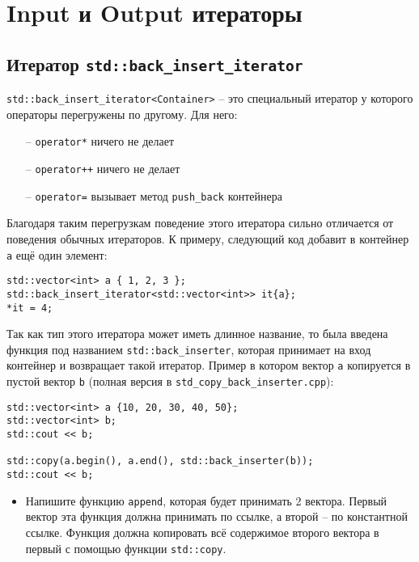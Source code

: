 \documentclass{article}
\begin{document}
\newpage

\section*{Input и Output итераторы}
\subsection*{Итератор \texttt{std::back\_insert\_iterator}}
\texttt{std::back\_insert\_iterator<Container>} -- это специальный итератор у которого операторы перегружены по другому. Для него:
\begin{itemize}
\item[--] \texttt{operator*} ничего не делает
\item[--] \texttt{operator++} ничего не делает
\item[--] \texttt{operator=} вызывает метод \texttt{push\_back} контейнера
\end{itemize}

Благодаря таким перегрузкам поведение этого итератора сильно отличается от поведения обычных итераторов. К примеру, следующий код добавит в контейнер \texttt{a} ещё один элемент:
\begin{lstlisting}
std::vector<int> a { 1, 2, 3 };
std::back_insert_iterator<std::vector<int>> it{a};
*it = 4;
\end{lstlisting}

Так как тип этого итератора может иметь длинное название, то была введена функция под названием \texttt{std::back\_inserter}, которая принимает на вход контейнер и возвращает такой итератор. Пример в котором вектор \texttt{a} копируется в пустой вектор \texttt{b} (полная версия в \texttt{std\_copy\_back\_inserter.cpp}):
\begin{lstlisting}
std::vector<int> a {10, 20, 30, 40, 50};
std::vector<int> b;
std::cout << b;

std::copy(a.begin(), a.end(), std::back_inserter(b));
std::cout << b;
\end{lstlisting}

\begin{itemize}
\item Напишите функцию \texttt{append}, которая будет принимать 2 вектора. Первый вектор эта функция должна принимать по ссылке, а второй -- по константной ссылке. Функция должна копировать всё содержимое второго вектора в первый с помощью функции \texttt{std::copy}.
\end{itemize}
\end{document}
